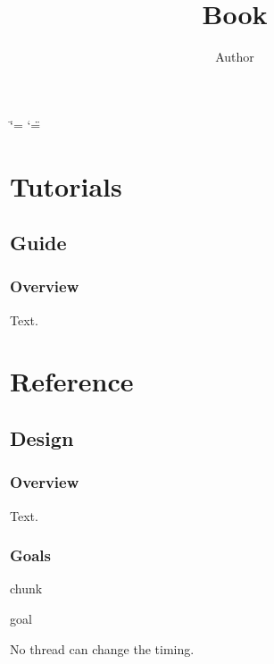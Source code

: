 \documentclass[letterpaper,10pt,english]{sphinxmanual}
\title{Book}
\date{}
\author{Author}
\begin{document}
\ifdefined\shorthandoff
  \ifnum\catcode`\=\string=\active\shorthandoff{=}\fi
  \ifnum\catcode`\"=\active{}\fi
\fi

\pagestyle{empty}
\sphinxmaketitle
\pagestyle{plain}
\renewcommand{\contentsname}{Contents}\sphinxtableofcontents
\pagestyle{normal}
\label{\detokenize{index::doc}}


\part*{Tutorials}

\sphinxstepscope


\chapter{Guide}
\label{\detokenize{guide/guide:guide}}\label{\detokenize{guide/guide::doc}}

\section{Overview}
\label{\detokenize{guide/guide:overview}}
\sphinxAtStartPar
Text.

\part*{Reference}

\sphinxstepscope


\chapter{Design}
\label{\detokenize{design/design:design}}\label{\detokenize{design/design::doc}}

\section{Overview}
\label{\detokenize{design/design:overview}}
\sphinxAtStartPar
Text.


\section{Goals}
\label{\detokenize{design/design:goals}}
\begin{sphinxuseclass}{chunk}
\begin{sphinxuseclass}{goal}\label{\detokenize{design/design:design.timing}}
\sphinxAtStartPar
{} 

\sphinxAtStartPar
No thread can change the timing.

\end{sphinxuseclass}
\end{sphinxuseclass}
\sphinxstepscope
\end{document}
